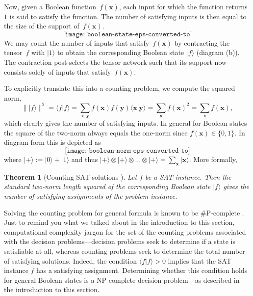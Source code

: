 \documentclass[aps,pra,12pt,nofootinbib,superscriptaddress,longbibliography]{revtex4-1}
\theoremstyle{plain}
\newtheorem{theorem}{Theorem}
\theoremstyle{definition}
\newcommand{\bra}[1]{\mbox{$\langle #1|$}}
\newcommand{\ket}[1]{\mbox{$|#1\rangle$}}
\newcommand{\braket}[2]{\mbox{$\langle #1|#2\rangle$}}
\newcommand{\ketbra}[2]{\mbox{$|#1\rangle\langle #2|$}}
\newcommand{\x}{\mathbf{x}}
\newcommand{\y}{\mathbf{y}}
\newcommand{\be}{\begin{equation}}
\newcommand{\ee}{\end{equation}}
\begin{document}
Now, given a Boolean function~$f(\x)$, each input for which the function returns~$1$ is said to satisfy the function.
The number of satisfying inputs is then equal to the size of the support of~$f(\x)$.
\be
  \texttt{[image: boolean-state-eps-converted-to]}
\ee
We may count the number of inputs that satisfy~$f(\x)$
by contracting the tensor~$f$ with $\ket{1}$ to obtain the corresponding Boolean state $\ket{f}$ (diagram (b)).
The contraction post-selects the tensor network such that its support
now consists solely of inputs that satisfy~$f(\x)$.

To explicitly translate this into a counting problem, we compute the squared norm,
\be 
\|\ket{f}\|^2 = \braket{f}{f}
=\sum_{\x, \y} f(\x) f(\y) \braket{\x}{\y} = \sum_\x f(\x)^2 = \sum_\x f(\x),
\ee 
which clearly gives the number of satisfying inputs.
In general for Boolean states the square of the two-norm always equals the one-norm
since $f(\x) \in \{0,1\}$.
In diagram form this is depicted as
\be
 \texttt{[image: boolean-norm-eps-converted-to]}
\ee
where $\ket{+}:= \ket{0}+\ket{1}$
and thus
$\ket{+}\otimes\ket{+}\otimes \ldots \otimes \ket{+} = \sum_{\x} \ket{\x}$. More formally, 
\begin{theorem}[Counting SAT solutions \cite{VTN,BMT15}]\label{theorem:3-SAT}
Let $f$ be a SAT instance. Then the standard two-norm length squared of the corresponding Boolean state $\ket{f}$ gives the number of satisfying assignments of the problem instance. 
\end{theorem}



Solving the counting problem for general formula is known to be {\sf \#P}-complete \cite{valiant1979complexity2}. Just to remind you what we talked about in the introduction to this section, computational complexity jargon for the set of the counting problems associated with the decision problems---decision problems seek to determine if a state is satisfiable at all, whereas counting problems seek to determine the total number of satisfying solutions.  Indeed, the condition 
$
\braket{f}{f} > 0
$
implies that the SAT instance $f$ has a satisfying assignment.
Determining whether this condition holds for general Boolean states is a {\sf NP}-complete decision problem---as described in the introduction to this section.
\end{document}
